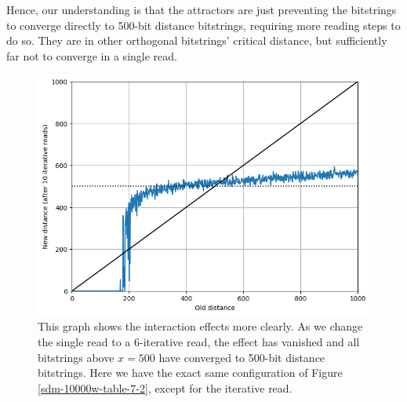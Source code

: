Hence, our understanding is that the attractors are just preventing the bitstrings to converge directly to 500-bit distance bitstrings, requiring more reading steps to do so. They are in other orthogonal bitstrings' critical distance, but sufficiently far not to converge in a single read.

\begin{figure}[h]
\centering\includegraphics[width=\textwidth]{images02/sdm-10000w-table-7-2-6iter.png}
\caption{This graph shows the interaction effects more clearly.  As we change the single read to a 6-iterative read, the effect has vanished and all bitstrings above $x=500$ have converged to 500-bit distance bitstrings. Here we have the exact same configuration of Figure \ref{sdm-10000w-table-7-2}, except for the iterative read.
\label{sdm-10000w-table-7-2-6iter}}
\end{figure}



